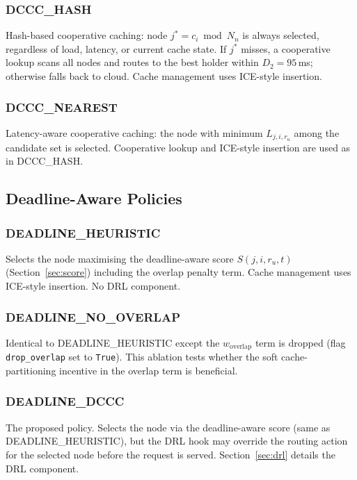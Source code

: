 \documentclass[12pt]{article}
\begin{document}
\subsubsection{DCCC\_HASH}

Hash-based cooperative caching: node $j^* = c_i \bmod N_n$ is always selected, regardless of load, latency, or current cache state. If $j^*$ misses, a cooperative lookup scans all nodes and routes to the best holder within $D_2 = 95$\,ms; otherwise falls back to cloud. Cache management uses ICE-style insertion.

\subsubsection{DCCC\_NEAREST}

Latency-aware cooperative caching: the node with minimum $L_{j,i,r_u}$ among the candidate set is selected. Cooperative lookup and ICE-style insertion are used as in DCCC\_HASH.

\subsection{Deadline-Aware Policies}

\subsubsection{DEADLINE\_HEURISTIC}

Selects the node maximising the deadline-aware score $S(j, i, r_u, t)$ (Section~\ref{sec:score}) including the overlap penalty term. Cache management uses ICE-style insertion. No DRL component.

\subsubsection{DEADLINE\_NO\_OVERLAP}

Identical to DEADLINE\_HEURISTIC except the $w_{\text{overlap}}$ term is dropped (flag \texttt{drop\_overlap} set to \texttt{True}). This ablation tests whether the soft cache-partitioning incentive in the overlap term is beneficial.

\subsubsection{DEADLINE\_DCCC}

The proposed policy. Selects the node via the deadline-aware score (same as DEADLINE\_HEURISTIC), but the DRL hook may override the routing action for the selected node before the request is served. Section~\ref{sec:drl} details the DRL component.
\end{document}

